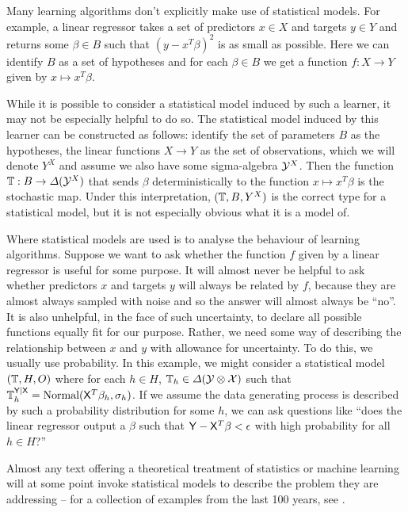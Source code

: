 Many learning algorithms don't explicitly make use of statistical models. For example, a linear regressor takes a set of predictors $x\in X$ and targets $y\in Y$ and returns some $\beta\in B$ such that $(y-x^T\beta)^2$ is as small as possible. Here we can identify $B$ as a set of hypotheses and for each $\beta\in B$ we get a function $f:X\to Y$ given by $x\mapsto x^T \beta$.

While it is possible to consider a statistical model induced by such a learner, it may not be especially helpful to do so. The statistical model induced by this learner can be constructed as follows: identify the set of parameters $B$ as the hypotheses, the linear functions $X\to Y$ as the set of observations, which we will denote $Y^X$ and assume we also have some sigma-algebra $\mathcal{Y}^X$. Then the function $\mathbb{T}:B\to \Delta(\mathcal{Y}^X)$ that sends $\beta$ deterministically to the function $x\mapsto x^T\beta$ is the stochastic map. Under this interpretation, $(\mathbb{T},B,Y^X)$ is the correct type for a statistical model, but it is not especially obvious what it is a model of.

Where statistical models are used is to analyse the behaviour of learning algorithms. Suppose we want to ask whether the function $f$ given by a linear regressor is useful for some purpose. It will almost never be helpful to ask whether predictors $x$ and targets $y$ will always be related by $f$, because they are almost always sampled with noise and so the answer will almost always be ``no''. It is also unhelpful, in the face of such uncertainty, to declare all possible functions equally fit for our purpose. Rather, we need some way of describing the relationship between $x$ and $y$ with allowance for uncertainty. To do this, we usually use probability. In this example, we might consider a statistical model $(\mathbb{T},H,O)$ where for each $h\in H$, $\mathbb{T}_h\in \Delta(\mathcal{Y}\otimes\mathcal{X})$ such that $\mathbb{T}_h^{\mathsf{Y}|\mathsf{X}}=\text{Normal}(\mathsf{X}^T\beta_h,\sigma_h)$. If we assume the data generating process is described by such a probability distribution for some $h$, we can ask questions like ``does the linear regressor output a $\beta$ such that $\mathsf{Y}-\mathsf{X}^T\beta<\epsilon$ with high probability for all $h\in H$?''

Almost any text offering a theoretical treatment of statistics or machine learning will at some point invoke statistical models to describe the problem they are addressing -- for a collection of examples from the last 100 years, see \cite{Goodfellow-et-al-2016,vapnik_nature_2013,bishop_pattern_2006,le_cam_comparison_1996,freedman_asymptotic_1963,wald_statistical_1950,de_finetti_foresight_1992,fisher_statistical_1992}.

